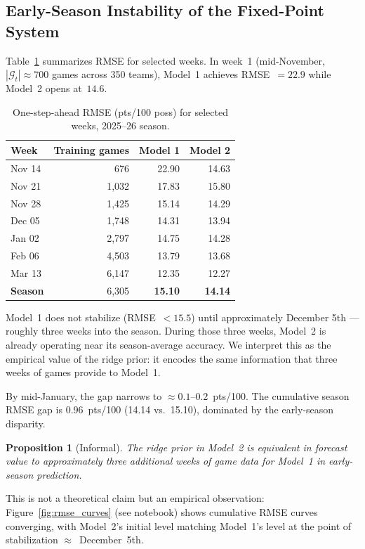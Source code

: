 \documentclass[11pt]{article}
\newtheorem{proposition}{Proposition}
\begin{document}
\subsection{Early-Season Instability of the Fixed-Point System}

Table~\ref{tab:weekly_rmse} summarizes RMSE for selected weeks.  In week~1
(mid-November, $|\mathcal{G}_t| \approx 700$ games across 350 teams), Model~1
achieves RMSE~$= 22.9$ while Model~2 opens at~$14.6$.

\begin{table}[h]
\centering
\caption{One-step-ahead RMSE (pts/100 poss) for selected weeks, 2025--26 season.}
\label{tab:weekly_rmse}
\begin{tabular}{lrrr}
\toprule
Week & Training games & Model 1 & Model 2 \\
\midrule
Nov 14 &   676 & 22.90 & 14.63 \\
Nov 21 & 1{,}032 & 17.83 & 15.80 \\
Nov 28 & 1{,}425 & 15.14 & 14.29 \\
Dec 05 & 1{,}748 & 14.31 & 13.94 \\
Jan 02 & 2{,}797 & 14.75 & 14.28 \\
Feb 06 & 4{,}503 & 13.79 & 13.68 \\
Mar 13 & 6{,}147 & 12.35 & 12.27 \\
\midrule
\textbf{Season} & 6{,}305 & \textbf{15.10} & \textbf{14.14} \\
\bottomrule
\end{tabular}
\end{table}

Model~1 does not stabilize (RMSE~$<15.5$) until approximately December 5th ---
roughly three weeks into the season.  During those three weeks, Model~2 is
already operating near its season-average accuracy.  We interpret this as the
empirical value of the ridge prior: it encodes the same information that three
weeks of games provide to Model~1.

By mid-January, the gap narrows to $\approx 0.1$--0.2~pts/100.  The cumulative
season RMSE gap is 0.96~pts/100 (14.14 vs.\ 15.10), dominated by the early-season
disparity.

\begin{proposition}[Informal]
  The ridge prior in Model~2 is equivalent in forecast value to approximately
  three additional weeks of game data for Model~1 in early-season prediction.
\end{proposition}

This is not a theoretical claim but an empirical observation: Figure~\ref{fig:rmse_curves}
(see notebook) shows cumulative RMSE curves converging, with Model~2's initial
level matching Model~1's level at the point of stabilization $\approx$~December~5th.
\end{document}
